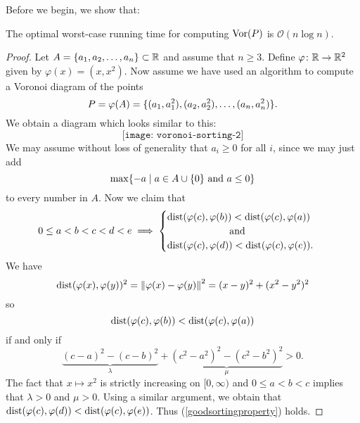 Before we begin, we show that:

\begin{thm} \label{thm:voronoicansort}
The optimal worst-case running time for computing $\operatorname{Vor}(P)$ is $\mathcal{O}(n \log n)$.
\end{thm}
\begin{proof}
Let $A = \{a_1, a_2, \ldots, a_n\} \subset \mathbb{R}$ and assume that $n \geq 3$. Define $\varphi \colon \mathbb{R} \to \mathbb{R}^2$ given by $\varphi(x) = (x, x^2)$. Now assume we have used an algorithm to compute a Voronoi diagram of the points
\[
    P = \varphi(A) = \{(a_1, a_1^2), (a_2, a_2^2), \ldots, (a_n, a_n^2)\}.
\]
We obtain a diagram which looks similar to this:
\[
    \texttt{[image: voronoi-sorting-2]}
\]
We may assume without loss of generality that $a_i \geq 0$ for all $i$, since we may just add
\[
    \max\{-a \mid a \in A \cup \{0\} \text{ and } a \leq 0\}
\]
to every number in $A$. Now we claim that
\begin{equation} \label{goodsortingproperty}
    0 \leq a < b < c < d < e
    \implies
    \begin{cases}
        \operatorname{dist}(\varphi(c), \varphi(b)) < \operatorname{dist}(\varphi(c), \varphi(a)) & \text{ } \\
        \quad\quad\quad\quad\quad\quad \text{ and } \quad & \text{ } \\
        \operatorname{dist}(\varphi(c), \varphi(d)) < \operatorname{dist}(\varphi(c), \varphi(e)). & \text{ }
    \end{cases}
\end{equation}
We have
\[
    \operatorname{dist}(\varphi(x), \varphi(y))^2 = \left\lVert \varphi(x) - \varphi(y) \right\rVert^2 = (x - y)^2 + (x^2 - y^2)^2
\]
so
\[
    \operatorname{dist}(\varphi(c), \varphi(b)) < \operatorname{dist}(\varphi(c), \varphi(a))
\]
if and only if
\[
    \underbrace{(c - a)^2 - (c - b)^2}_{\lambda} + \underbrace{(c^2 - a^2)^2 - (c^2 - b^2)^2}_{\mu} > 0.
\]
The fact that $x \mapsto x^2$ is strictly increasing on $[0, \infty)$ and $0 \leq a < b < c$ implies that $\lambda > 0$ and $\mu > 0$. Using a similar argument, we obtain that $\operatorname{dist}(\varphi(c), \varphi(d)) < \operatorname{dist}(\varphi(c), \varphi(e))$. Thus (\ref{goodsortingproperty}) holds.


\end{proof}
